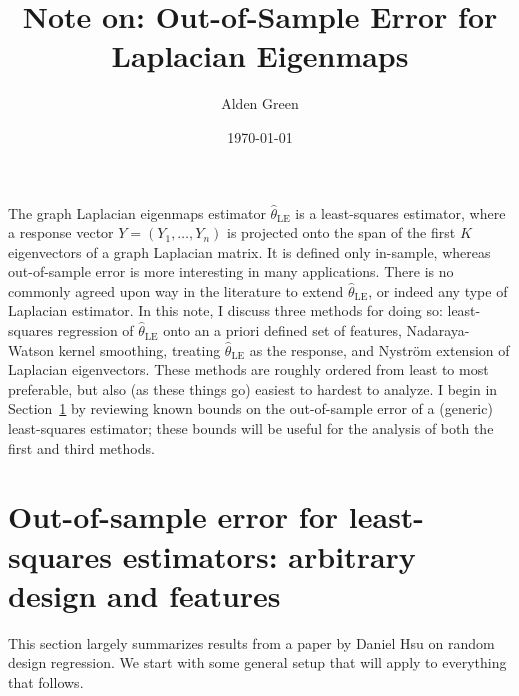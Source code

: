 \documentclass{article}
\newcommand{\1}{\mathbf{1}}
\newcommand{\wh}[1]{\widehat{#1}}
\newcommand{\LE}{\mathrm{LE}}
\theoremstyle{definition}
\theoremstyle{remark}
\begin{document}
\title{Note on: Out-of-Sample Error for Laplacian Eigenmaps}
\author{Alden Green}
\date{\today}
\maketitle

The graph Laplacian eigenmaps estimator $\wh{\theta}_{\LE}$ is a least-squares estimator, where a response vector $Y = (Y_1,\ldots,Y_n)$ is projected onto the span of the first $K$ eigenvectors of a graph Laplacian matrix. It is defined only in-sample, whereas out-of-sample error is more interesting in many applications. There is no commonly agreed upon way in the literature to extend $\wh{\theta}_{\LE}$, or indeed any type of Laplacian estimator. In this note, I discuss three methods for doing so: least-squares regression of $\wh{\theta}_{\LE}$ onto an a priori defined set of features, Nadaraya-Watson kernel smoothing, treating $\wh{\theta}_{\LE}$ as the response, and Nystr\"{o}m extension of Laplacian eigenvectors. These methods are roughly ordered from least to most preferable, but also (as these things go) easiest to hardest to analyze. I begin in Section~\ref{sec:least_squares_arbitrary_design_and_features} by reviewing known bounds on the out-of-sample error of a (generic) least-squares estimator; these bounds will be useful for the analysis of both the first and third methods.

\section{Out-of-sample error for least-squares estimators: arbitrary design and features}
\label{sec:least_squares_arbitrary_design_and_features}
This section largely summarizes results from a paper by Daniel Hsu on random design regression. We start with some general setup that will apply to everything that follows.
\end{document}
